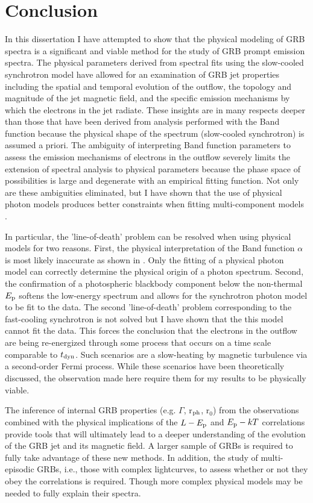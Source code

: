 \section{Conclusion}
In this dissertation I have attempted to show that the physical
modeling of GRB spectra is a significant and viable method for the
study of GRB prompt emission spectra. The physical parameters derived
from spectral fits using the slow-cooled synchrotron model have
allowed for an examination of GRB jet properties including the spatial
and temporal evolution of the outflow, the topology and magnitude of
the jet magnetic field, and the specific emission mechanisms by which
the electrons in the jet radiate. These insights are in many respects
deeper than those that have been derived from analysis performed with
the Band function because the physical shape of the spectrum
(slow-cooled synchrotron) is assumed a priori. The ambiguity of
interpreting Band function parameters to assess the emission
mechanisms of electrons in the outflow severely limits the extension of
spectral analysis to physical parameters because the phase space of
possibilities is large and degenerate with an empirical fitting
function. Not only are these ambiguities eliminated, but I have shown
that the use of physical photon models produces better constraints
when fitting multi-component models .

In particular, the 'line-of-death' problem can be resolved when using
physical models for two reasons. First, the physical interpretation of
the Band function $\alpha$ is most likely inaccurate as shown
in . Only the fitting of a physical photon
model can correctly determine the physical origin of a photon
spectrum. Second, the confirmation of a photospheric blackbody
component below the non-thermal $E_{\rm p}$ softens the low-energy spectrum
and allows for the synchrotron photon model to be fit to the data. The
second 'line-of-death' problem corresponding to the fast-cooling
synchrotron is not solved but I have shown that the this model cannot
fit the data. This forces the conclusion that the electrons in the
outflow are being re-energized through some process that occurs on a
time scale comparable to $t_{\rm dyn}$. Such scenarios are a
slow-heating by magnetic turbulence via a second-order Fermi
process. While these scenarios have been theoretically discussed, the
observation made here require them for my results to be physically
viable.

The inference of internal GRB properties (e.g. $\Gamma$, r$_{\rm ph}$,
r$_0$) from the observations combined with the physical implications
of the $L-E_{\rm p}$ and $E_{\rm p}-kT$ correlations provide tools that will
ultimately lead to a deeper understanding of the evolution of the GRB
jet and its magnetic field. A larger sample of GRBs is required to
fully take advantage of these new methods. In addition, the study of
multi-episodic GRBs, i.e., those with complex lightcurves, to assess
whether or not they obey the correlations is required. Though more
complex physical models may be needed to fully explain their spectra.




